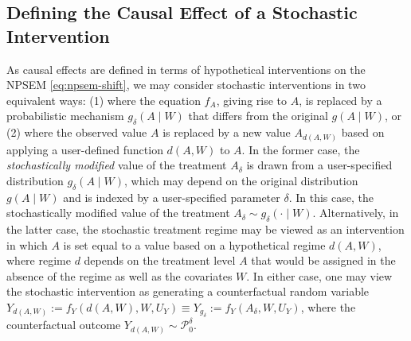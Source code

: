 \documentclass[12pt, krantz2,]{krantz}
\theoremstyle{definition}
\theoremstyle{definition}
\theoremstyle{definition}
\newcommand{\1}{\mathbbm{1}}
\begin{document}
\hypertarget{defining-the-causal-effect-of-a-stochastic-intervention}{%
\subsection{Defining the Causal Effect of a Stochastic Intervention}\label{defining-the-causal-effect-of-a-stochastic-intervention}}

As causal effects are defined in terms of hypothetical interventions on the
NPSEM \eqref{eq:npsem-shift}, we may consider stochastic interventions in two
equivalent ways: (1) where the equation \(f_A\), giving rise to \(A\), is replaced
by a probabilistic mechanism \(g_{\delta}(A \mid W)\) that differs from the
original \(g(A \mid W)\), or (2) where the observed value \(A\) is replaced by a
new value \(A_{d(A,W)}\) based on applying a user-defined function \(d(A,W)\) to
\(A\). In the former case, the \emph{stochastically modified} value of the treatment
\(A_{\delta}\) is drawn from a user-specified distribution \(g_\delta(A \mid W)\),
which may depend on the original distribution \(g(A \mid W)\) and is indexed by
a user-specified parameter \(\delta\). In this case, the stochastically modified
value of the treatment \(A_{\delta} \sim g_{\delta}(\cdot \mid W)\).
Alternatively, in the latter case, the stochastic treatment regime may be
viewed as an intervention in which \(A\) is set equal to a value based on a
hypothetical regime \(d(A, W)\), where regime \(d\) depends on the treatment level
\(A\) that would be assigned in the absence of the regime as well as the
covariates \(W\). In either case, one may view the stochastic intervention as
generating a counterfactual random variable \(Y_{d(A,W)} := f_Y(d(A,W), W, U_Y) \equiv Y_{g_{\delta}} := f_Y(A_{\delta}, W, U_Y)\), where the counterfactual
outcome \(Y_{d(A,W)} \sim \mathcal{P}_0^{\delta}\).
\end{document}
